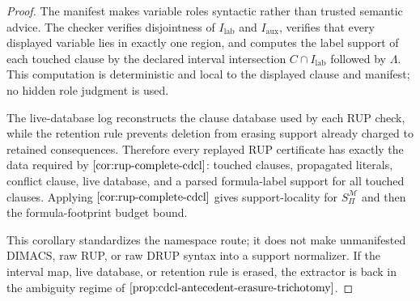 \documentclass[11pt]{article}
\theoremstyle{definition}
\begin{document}
\begin{proof}
The manifest makes variable roles syntactic rather than trusted semantic advice.  The checker verifies disjointness of \(I_{\mathrm{lab}}\) and \(I_{\mathrm{aux}}\), verifies that every displayed variable lies in exactly one region, and computes the label support of each touched clause by the declared interval intersection \(C\cap I_{\mathrm{lab}}\) followed by \(\Lambda\).  This computation is deterministic and local to the displayed clause and manifest; no hidden role judgment is used.

The live-database log reconstructs the clause database used by each RUP check, while the retention rule prevents deletion from erasing support already charged to retained consequences.  Therefore every replayed RUP certificate has exactly the data required by \(\Cref{cor:rup-complete-cdcl}\): touched clauses, propagated literals, conflict clause, live database, and a parsed formula-label support for all touched clauses.  Applying \(\Cref{cor:rup-complete-cdcl}\) gives support-locality for \(S_\Pi^{\mathcal M}\) and then the formula-footprint budget bound.

This corollary standardizes the namespace route; it does not make unmanifested DIMACS, raw RUP, or raw DRUP syntax into a support normalizer.  If the interval map, live database, or retention rule is erased, the extractor is back in the ambiguity regime of \(\Cref{prop:cdcl-antecedent-erasure-trichotomy}\).
\end{proof}
\end{document}
